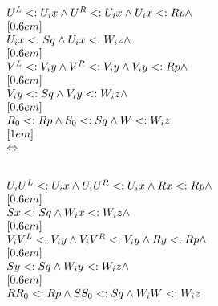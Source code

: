 \[
    \begin{array}{l}
    {U}^{L} <: {U}_{i}x \land
    {U}^{R} <: {U}_{i}x \land
    {U}_{i}x <: {R}p \land \\
    [0.6em] \\
    {U}_{i}x <: {S}q \land {U}_{i}x <: {W}_{i}z \land \\
    [0.6em] \\
    {V}^{L} <: {V}_{i}y \land
    {V}^{R} <: {V}_{i}y \land
    {V}_{i}y <: {R}p \land \\
    [0.6em] \\
    {V}_{i}y <: {S}q \land {V}_{i}y <: {W}_{i}z \land \\
    [0.6em] \\
    {R}_{0} <: {R}p \land {S}_{0} <: {S}q \land {W} <: {W}_{i}z \\
    [1em] \\
    \Leftrightarrow \\
    [1em] \\
    {U}_{i}{U}^{L} <: {U}_{i}x \land {U}_{i}{U}^{R} <: {U}_{i}x \land {R}x <: {R}p \land \\
    [0.6em] \\
    {S}x <: {S}q \land {W}_{i}x <: {W}_{i}z \land \\
    [0.6em] \\
    {V}_{i}{V}^{L} <: {V}_{i}y \land {V}_{i}{V}^{R} <: {V}_{i}y \land {R}y <: {R}p \land \\
    [0.6em] \\
    {S}y <: {S}q \land {W}_{i}y <: {W}_{i}z \land \\
    [0.6em] \\
    {R}{R}_{0} <: {R}p \land {S}{S}_{0} <: {S}q \land {W}_{i}{W} <: {W}_{i}z \\

\end{array}\]
